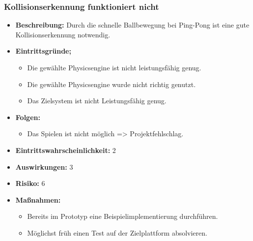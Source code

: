 \subsubsection{Kollisionserkennung funktioniert nicht}
\begin{itemize}
	\item \textbf{Beschreibung:} \newline
	Durch die schnelle Ballbewegung bei Ping-Pong ist eine gute Kollisionserkennung notwendig. 
	\item \textbf{Eintrittsgründe;}
	\begin{itemize}
		\item Die gewählte Physicsengine ist nicht leistungsfähig genug.
		\item Die gewählte Physicsengine wurde nicht richtig genutzt.
		\item Das Zielsystem ist nicht Leistungsfähig genug.
	\end{itemize}
	\item \textbf{Folgen:}
	\begin{itemize}
		\item Das Spielen ist nicht möglich => Projektfehlschlag.
	\end{itemize}
	\item \textbf{Eintrittswahrscheinlichkeit:} 2
	\item \textbf{Auswirkungen:} 3
	\item \textbf{Risiko:} 6
	\item \textbf{Maßnahmen:}
	\begin{itemize}
		\item Bereits im Prototyp eine Beispielimplementierung durchführen.
		\item Möglichst früh einen Test auf der Zielplattform absolvieren.
	\end{itemize}
\end{itemize}
